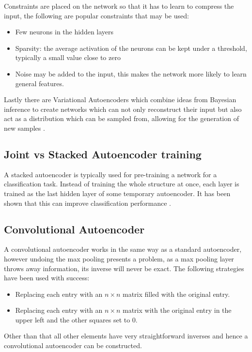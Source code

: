     Constraints are
    placed on the network so that it has to learn to compress the input, the following
    are popular constraints that may be used:
    \begin{itemize}
      \item Few neurons in the hidden layers
      \item Sparsity: the average activation of the neurons can be kept under a
      threshold, typically a small value close to zero \cite{autong}
      \item Noise may be added to the input, this makes the network more likely
      to learn general features.
    \end{itemize}
    Lastly there are Variational Autoencoders which combine ideas from Bayesian inference
    to create networks which can not only reconstruct their input but also act as a
    distribution which can be sampled from, allowing for the generation of new samples \cite{Kingma2013}.

  \subsection{Joint vs Stacked Autoencoder training}
    A stacked autoencoder is typically used for pre-training a network for a classification task.
    Instead of training the whole structure at once, each layer is trained as the last hidden
    layer of some temporary autoencoder. It has been shown that this can improve classification performance \cite{stacks}.
  \subsection{Convolutional Autoencoder}
    A convolutional autoencoder works in the same way as a standard autoencoder, however
    undoing the max pooling presents a problem, as a max pooling layer throws away
    information, its inverse will never be exact. The following strategies have been
    used with success:
    \begin{itemize}
      \item Replacing each entry with an $n \times n$ matrix filled with the original
      entry.
      \item Replacing each entry with an  $n\times n$  matrix with
      the original entry in the upper left and the other squares set to 0. \cite{Dosovitskiy2015}
    \end{itemize}

    Other than that all other elements have very straightforward inverses and hence
    a convolutional autoencoder can be constructed.
